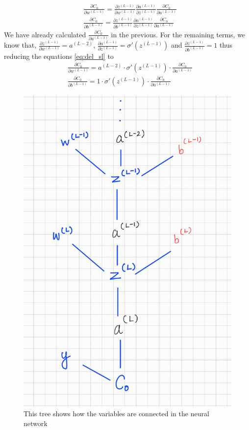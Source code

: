 \begin{equation}
    \label{eq:del_sl}
    \begin{aligned}
        &\frac{\partial C_0}{\partial w^{(L-1)}} = \frac{\partial z^{(L-1)}}{\partial w^{(L-1)}} \frac{\partial a^{(L-1)}}{\partial z^{(L-1)}} \frac{\partial C_0}{\partial a^{(L-1)}}\\
        &\frac{\partial C_0}{\partial b^{(L-1)}} = \frac{\partial z^{(L-1)}}{\partial b^{(L-1)}} \frac{\partial a^{(L-1)}}{\partial z^{(L-1)}} \frac{\partial C_0}{\partial a^{(L-1)}}
    \end{aligned}
\end{equation}
We have already calculated $\frac{\partial C_0}{\partial a^{(L-1)}}$ in the previous. For the remaining terms, we know that,
 $\frac{\partial z^{(L-1)}}{\partial w^{(L-1)}} = a^{(L-2)}$, $\frac{\partial a^{(L-1)}}{\partial z^{(L-1)}} = \sigma'(z^{(L-1)})$ and  $\frac{\partial z^{(L-1)}}{\partial b^{(L-1)}} = 1$
 thus reducing the equations \eqref{eq:del_sl} to
 \begin{equation}
    \label{eq:del_sl_f}
    \begin{aligned}
        &\frac{\partial C_0}{\partial w^{(L-1)}} =  a^{(L-2)} \cdot \sigma'(z^{(L-1)}) \cdot \frac{\partial C_0}{\partial a^{(L-1)}}\\
        &\frac{\partial C_0}{\partial b^{(L-1)}} = 1 \cdot \sigma'(z^{(L-1)}) \cdot \frac{\partial C_0}{\partial a^{(L-1)}}
    \end{aligned}
\end{equation}
\begin{figure}
\centering
    \includegraphics[width=.5\textwidth]{Figures/treeNN.png}
    \caption{This tree shows how the variables are connected in the neural network}
    \label{fig:tree_NN}
\end{figure} 

